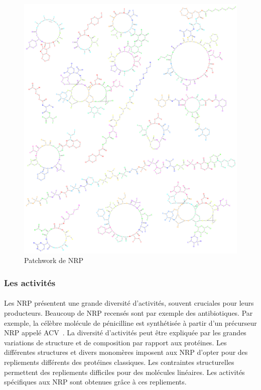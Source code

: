 \documentclass[12pt,french,twoside]{report}
\begin{document}
\begin{figure}[h!]
  \begin{center}
    \includegraphics[width=450px]{Figures/bio/Intro/NRPs/peps.png}
    \caption{\label{peps_example}Patchwork de NRP}
  \end{center}
\end{figure}


\subsubsection{Les activités}

\paragraph{}Les NRP présentent une grande diversité d'activités, souvent cruciales pour leurs producteurs.
Beaucoup de NRP recensés sont par exemple des antibiotiques.
Par exemple, la célèbre molécule de pénicilline est synthétisée à partir d'un précurseur NRP appelé ACV~\cite{queener_molecular_1990}.
La diversité d'activités peut être expliquée par les grandes variations de structure et de composition par rapport aux protéines.
Les différentes structures et divers monomères imposent aux NRP d'opter pour des repliements différents des protéines classiques.
Les contraintes structurelles permettent des repliements difficiles pour des molécules linéaires.
Les activités spécifiques aux NRP sont obtenues grâce à ces repliements.
\end{document}
